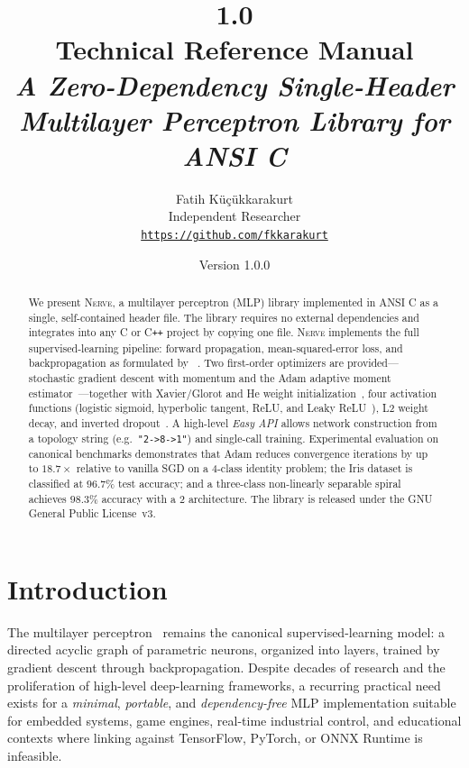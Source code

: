 \documentclass[11pt,a4paper]{article}
\title{%
  \textbf{\Large \nerve{} 1.0}\\[0.5em]
  \large Technical Reference Manual\\[0.3em]
  \normalsize\itshape
  A Zero-Dependency Single-Header Multilayer Perceptron Library for ANSI C%
}
\author{%
  Fatih K\"{u}\c{c}\"{u}kkarakurt\\[0.4em]
  \small Independent Researcher\\[0.1em]
  \small \href{https://github.com/fkkarakurt}{\texttt{https://github.com/fkkarakurt}}
}
\date{Version 1.0.0\quad\textbullet\quad 2026}
\newcommand{\nerve}{\textsc{Nerve}}
\begin{document}

\maketitle
\thispagestyle{empty}
\vspace{1em}

\begin{abstract}
\noindent
We present \nerve{}, a multilayer perceptron (MLP) library implemented in ANSI
C as a single, self-contained header file. The library requires no external
dependencies and integrates into any C or C\texttt{++} project by copying one
file. \nerve{} implements the full supervised-learning pipeline: forward
propagation, mean-squared-error loss, and backpropagation as formulated by
\citeauthor{rumelhart1986}~\cite{rumelhart1986}. Two first-order optimizers are
provided---stochastic gradient descent with momentum and the Adam adaptive
moment estimator~\cite{kingma2015}---together with Xavier/Glorot and He weight
initialization~\cite{glorot2010,he2015}, four activation functions (logistic
sigmoid, hyperbolic tangent, ReLU, and Leaky ReLU~\cite{nair2010,maas2013}),
L2 weight decay, and inverted dropout~\cite{srivastava2014}. A high-level
\emph{Easy API} allows network construction from a topology string (e.g.\
\texttt{"2->8->1"}) and single-call training. Experimental evaluation on
canonical benchmarks demonstrates that Adam reduces convergence iterations by
up to $18.7\times$ relative to vanilla SGD on a 4-class identity problem;
the Iris dataset is classified at $96.7\%$ test accuracy; and a three-class
non-linearly separable spiral achieves $98.3\%$ accuracy with a
2\textendash32\textendash3 architecture. The library is released
under the GNU General Public License~v3.
\end{abstract}

\vspace{0.5em}
\newpage
\tableofcontents
\newpage

\section{Introduction}

The multilayer perceptron~\cite{rumelhart1986,rosenblatt1958} remains the
canonical supervised-learning model: a directed acyclic graph of parametric
neurons, organized into layers, trained by gradient descent through
backpropagation. Despite decades of research and the proliferation of
high-level deep-learning frameworks, a recurring practical need exists for
a \emph{minimal}, \emph{portable}, and \emph{dependency-free} MLP
implementation suitable for embedded systems, game engines, real-time
industrial control, and educational contexts where linking against TensorFlow,
PyTorch, or ONNX Runtime is infeasible.
\end{document}
